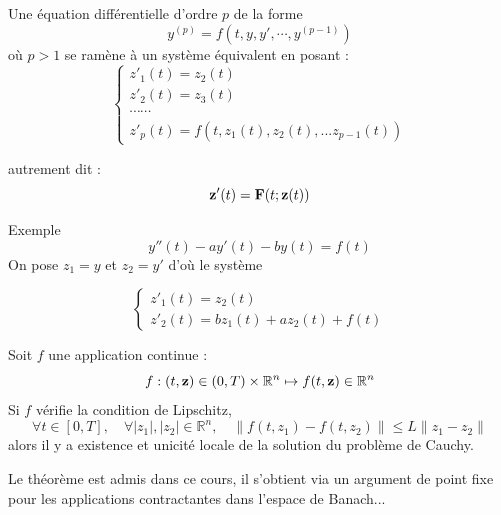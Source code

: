 \documentclass{beamer}
\begin{document}
  
  \begin{frame}
Une équation différentielle d'ordre $p$ de la forme 
\[y^{(p)}=f(t,y,y',\cdots,y^{(p-1)})\] 
où $p > 1$ se ramène à un système équivalent en posant :
 \[\left\{\begin{array}{l}
  z'_1(t)=z_2(t)\\
  z'_2(t)=z_3(t)\\
  \cdots\cdots \\
  z'_p(t)=f(t,z_1(t),z_2(t),...z_{p-1}(t))
  \end{array}\right.\]

autrement dit :
\[{\bf z}'(t) = {\bf F}(t; {\bf z}(t)) \]
\begin{block}{Exemple}
\[y''(t)-ay'(t)-by(t)=f(t)\]
On pose $z_1=y$ et $z_2=y'$ d'où le système

 \[\left\{\begin{array}{l}
  z'_1(t)=z_2(t)\\
  z'_2(t)= b z_1(t)+a z_2(t)+f(t)
  \end{array}\right.\]
\end{block}

  \end{frame}
  \begin{frame}
    \begin{theorem}
    Soit $f$ une application continue : \[f:(t,{\bf z})\in(0,T)\times \mathbb{R}^n\mapsto f(t,{\bf z})\in \mathbb{R}^n\]
Si $f$ vérifie la condition de Lipschitz,
\[\forall t\in[0,T], \quad \forall |z_1|, |z_2| \in \mathbb{R}^n, \quad \|f(t, z_1) - f(t, z_2)\| \leq L\|z_1 - z_2\| \]
alors il y a existence et unicité locale de la solution du problème de Cauchy.
\end{theorem}
    Le théorème est admis dans ce cours, il s'obtient via un argument de point fixe pour les applications contractantes dans l'espace de Banach...

   \end{frame}
   
\end{document}
